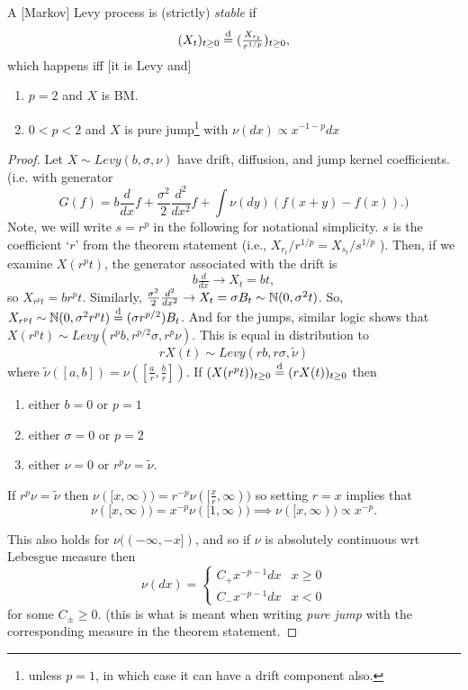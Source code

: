 \documentclass[../../../Master/AppliedStochastics.tex]{subfiles}
\author{Isaac}
\date{19 November 2018}
\begin{document}
%


\makelecture


\begin{theorem}
A [Markov] Levy process is (strictly) \emph{stable} if 
$$
(X_t)_{t \geq 0} \overset{ \text{d} }{=} (\tfrac{X_{r_t}}{ r^{1/p}})_{t \geq 0}, 
$$
which happens iff [it is Levy and]
\begin{enumerate}
\item $p = 2$ and $X$ is BM.
\item $0 < p < 2$ and $X$ is pure jump\footnote{unless $p=1$, in which case it 
can have a drift component also.} with $\nu(dx) \propto x^{-1-p} dx$
\end{enumerate}
\end{theorem}

\begin{proof}
Let $X \sim Levy(b,\sigma,\nu)$ have drift, diffusion, and jump kernel 
coefficients. (i.e. with generator 
$$
G(f) = b \frac{d}{dx} f + \frac{\sigma^2}{2} \frac{d^2}{dx^2} f + \int \nu (dy) 
(f(x+y) - f(x) ). )
$$ 
Note, we will write $s = r^p$ in the following for notational simplicity. $s$ 
is the coefficient `$r$' from the theorem statement (i.e., $X_{r_t} / r^{1/p} = 
X_{s_t} / s^{1/p}$ ). Then, if we examine $X(r^p t)$, the generator associated 
with the drift is 
$$b \tfrac{d}{dx} \rightarrow X_t = bt,
$$
so $X_{r^p t} = br^p t$. Similarly, $\frac{\sigma^2}{2} \tfrac{d^2}{dx^2} 
\rightarrow X_t = \sigma B_t \sim \mathbb{N} (0,\sigma^2t)$. So, $X_{r^p t} \sim \mathbb{N}(0, 
\sigma^2 r^p t) \overset{ \text{d} }{=} (\sigma r^{p/2}) B_t$. And for the jumps, similar logic 
shows that $X(r^p t) \sim Levy ( r^p b, r^{p/2} \sigma, r^p \nu)$. This is 
equal in distribution to 
$$
r X(t) \sim Levy ( rb, r \sigma, \tilde{\nu})
$$
where $\tilde{\nu}([a,b]) = \nu( [\tfrac{a}{r}, \tfrac{b}{r}] )$. If $(X(r^p 
t))_{t \geq 0} \overset{ \text{d} }{=} (r X(t))_{t \geq 0}$ then 
\begin{enumerate}
\item either $b = 0$ or $p=1$
\item either $\sigma = 0$ or $p=2$
\item either $\nu = 0$ or $r^p \nu = \tilde{\nu}$.
\end{enumerate} 

If $r^p \nu = \tilde{\nu}$ then $\nu ( [x, \infty) ) = r^{-p} \nu ( 
[\frac{x}{r}, \infty ) )$ so setting $r = x$ implies that 
$$
\nu ( [x , \infty) ) = x^{-p} \nu( [1, \infty) ) \implies \nu ([x, \infty)) 
\propto x^{-p}.
$$

This also holds for $\nu( (- \infty, -x])$, and so if $\nu$ is absolutely 
continuous wrt Lebesgue measure then 
$$
\nu(dx) = 
\begin{cases}
C_+ x^{-p-1} dx & x \geq 0 \\
C_{-} x^{-p-1} dx & x < 0
\end{cases}
$$
for some $C_\pm \geq 0$. (this is what is meant when writing \emph{pure jump} 
with the corresponding measure in the theorem statement.
\end{proof}
\end{document}
